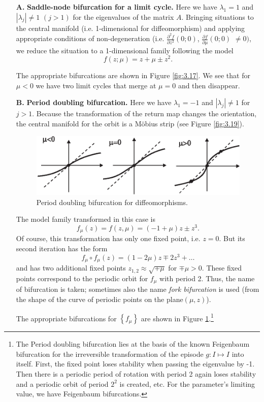 \begin{enumerate}
	\item [\textbf{A.}]\textbf{Saddle-node bifurcation for a limit cycle.} Here we have $\lambda _{1}=1$ and $\left\vert \lambda _{j}\right\vert \not=1$ $(j>1)$ for the eigenvalues of the matrix $A$. Bringing situations to the central manifold (i.e. 1-dimensional for diffeomorphism) and applying appropriate conditions of non-degeneration (i.e. $\frac{\partial
	^{2}f}{\partial z^{2}}(0;0)$, $\frac{\partial f}{\partial \mu }(0;0)$ $\not=0)$, we reduce the situation to a 1-dimensional family following the model
	$$
	f(z;\mu) = z+\mu \pm z^2.
	$$
	
	The appropriate bifurcations are shown in Figure \ref{fig:3.17}. We see that for $\mu <0$ we have two limit cycles that merge at $\mu =0$ and then disappear.
	\item [\textbf{B.}]\textbf{Period doubling bifurcation.} Here we have $\lambda _{1}=-1$ and $\left\vert \lambda _{j}\right\vert \not=1$ for $j>1.$ Because the transformation of the return map changes the orientation, the central manifold for the orbit is a Möbius strip (see Figure \ref{fig:3.19}).
	\begin{figure}[!ht]
		\centering
		\includegraphics [scale=1.4]{jtr318}
		\caption{Period doubling bifurcation for diffeomorphisms.}
		\label{fig:3.18}
	\end{figure}
	
	The model family transformed in this case is
	$$
	f_{\mu }(z)=f(z,\mu )=\left( -1+\mu \right) z\pm z^{3}.
	$$
	Of course, this transformation has only one fixed point, i.e. $z = 0$. But its second iteration has the form
	$$
	f_{\mu }\circ f_{\mu }(z)=(1-2\mu )z\mp 2z^{3}+\ldots
	$$
	and has two additional fixed points $z_{1,2}\approx \sqrt{\mp \mu }$ for $%
	\mp \mu >0$. These fixed points correspond to the periodic orbit for $f_{\mu}$ with period 2. Thus, the name of bifurcation is taken; sometimes also the name \textit{fork bifurcation} is used (from the shape of the curve of periodic points on the plane$\left( \mu ,z\right)$).
	
	The appropriate bifurcations for $\left\{ f_{\mu }\right\} $ are shown in Figure \ref{fig:3.18}.\footnote{The Period doubling bifurcation lies at the basis of the known Feigenbaum bifurcation for the irreversible transformation of the episode $g:I\longmapsto I$ into itself. First, the fixed point loses stability when passing the eigenvalue by -1. Then there is a periodic period of rotation with period 2 again loses stability and a periodic orbit of period $2^2$ is created, etc. For the parameter's limiting value, we have Feigenbaum bifurcations.}
	

\end{enumerate}

